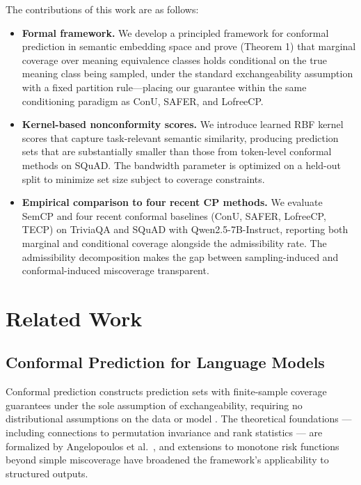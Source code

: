 \documentclass{article}
\begin{document}
The contributions of this work are as follows:

\begin{itemize}
  \item \textbf{Formal framework.} We develop a principled framework for conformal prediction in semantic embedding space and prove (Theorem 1) that marginal coverage over meaning equivalence classes holds conditional on the true meaning class being sampled, under the standard exchangeability assumption with a fixed partition rule---placing our guarantee within the same conditioning paradigm as ConU, SAFER, and LofreeCP.
  \item \textbf{Kernel-based nonconformity scores.} We introduce learned RBF kernel scores that capture task-relevant semantic similarity, producing prediction sets that are substantially smaller than those from token-level conformal methods on SQuAD. The bandwidth parameter is optimized on a held-out split to minimize set size subject to coverage constraints.
  \item \textbf{Empirical comparison to four recent CP methods.} We evaluate SemCP and four recent conformal baselines (ConU, SAFER, LofreeCP, TECP) on TriviaQA and SQuAD with Qwen2.5-7B-Instruct, reporting both marginal and conditional coverage alongside the admissibility rate. The admissibility decomposition makes the gap between sampling-induced and conformal-induced miscoverage transparent.
\end{itemize}

\section{Related Work}

\label{sec:related_work}

\subsection{Conformal Prediction for Language Models}

\label{sec:conformal_prediction_for_language_models}

Conformal prediction constructs prediction sets with finite-sample coverage guarantees under the sole assumption of exchangeability, requiring no distributional assumptions on the data or model \cite{angelopoulos2021gentle}. The theoretical foundations --- including connections to permutation invariance and rank statistics --- are formalized by Angelopoulos et al.\ \cite{angelopoulos2024theoretical}, and extensions to monotone risk functions beyond simple miscoverage \cite{angelopoulos2022conformal} have broadened the framework's applicability to structured outputs.
\end{document}
